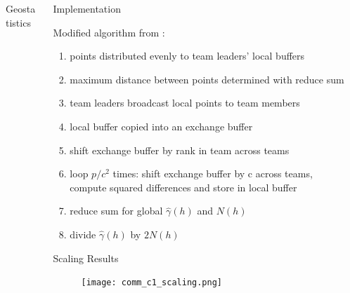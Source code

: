 \documentclass[serif,mathserif,final]{beamer}
\begin{document}
\begin{frame}{}
\begin{columns}[t]
\begin{column}{0.32\linewidth}
\begin{block}{Geostatistics}
      \end{block}
  

    \end{column}%

    \begin{column}{0.32\linewidth}

      \begin{block}{Implementation}
	
      \begin{flushleft} Modified algorithm from \cite{Koanantakool}:
        \begin{enumerate}
          \item points distributed evenly to team leaders' local buffers
          \item maximum distance between points determined with reduce sum
          \item team leaders broadcast local points to team members
          \item local buffer copied into an exchange buffer
          \item shift exchange buffer by rank in team across teams
          \item loop $p/c^2$ times: shift exchange buffer by c across teams, compute squared differences and store in local buffer
          \item reduce sum for global $\hat{\gamma}(h)$ and $N(h)$
          \item divide $\hat{\gamma}(h)$ by $2N(h)$
        \end{enumerate}
        \end{flushleft}
      \end{block}
      
    
      
       \begin{block}{Scaling Results}
        \begin{figure}[htbp]
            \centering
            \texttt{[image: comm\_c1\_scaling.png]} %
            \label{fig:plot}
         \end{figure}
      \end{block}

    \end{column}%

    \begin{column}{0.32\linewidth}


\end{column}
\end{columns}
\end{frame}
\end{document}
